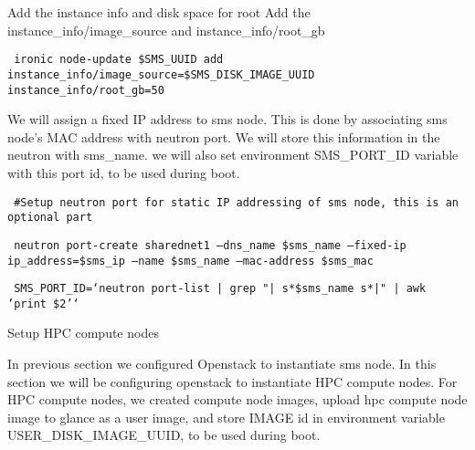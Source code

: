 \documentclass[12pt]{article}
\begin{document}
Add the instance info and disk space for root 
Add the instance\_info/image\_source and instance\_info/root\_gb

\begin{bash}\texttt{\small{     ironic node-update \$SMS\_UUID add instance\_info/image\_source=\${SMS\_DISK\_IMAGE\_UUID} instance\_info/root\_gb=50}}\end{bash}

We will assign a fixed IP address to sms node. This is done by associating sms node’s MAC address with neutron port. We will store this information in the neutron with sms\_name. we will also set environment SMS\_PORT\_ID variable with this port id, to be used during boot.

\begin{bash}\texttt{\small{     \#Setup neutron port for static IP addressing of sms node, this is an optional part}}\end{bash}
\begin{bash}\texttt{\small{     neutron port-create sharednet1 --dns\_name \$sms\_name --fixed-ip ip\_address=\$sms\_ip --name \$sms\_name --mac-address \$sms\_mac}}\end{bash}
\begin{bash}\texttt{\small{     SMS\_PORT\_ID=`neutron port-list | grep "|\\s*\$sms\_name\\s*|" | awk '{print \$2}'`}}\end{bash}

Setup HPC compute nodes

In previous section we configured Openstack to instantiate sms node. In this section we will be configuring openstack to instantiate HPC compute nodes.
For HPC compute nodes, we created compute node images, upload hpc compute node image to glance as a user image, and store IMAGE id in environment variable USER\_DISK\_IMAGE\_UUID, to be used during boot.
\end{document}

